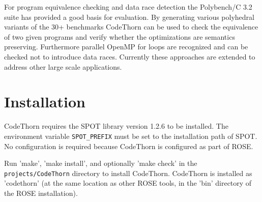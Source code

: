 \documentclass[natbib]{article}
\begin{document}
For program equivalence checking and data race detection the
Polybench/C 3.2 suite has provided a good basis for evaluation. By
generating various polyhedral variants of the 30+ benchmarks CodeThorn
can be used to check the equivalence of two given programs and verify
whether the optimizations are semantics preserving. Furthermore
parallel OpenMP for loops are recognized and can be checked not to
introduce data races. Currently these approaches are extended to
address other large scale applications.

\section{Installation}

CodeThorn requires the SPOT library version 1.2.6 to be installed. The
environment variable \verb+SPOT_PREFIX+ must be set to the
installation path of SPOT. No configuration is required because
CodeThorn is configured as part of ROSE.

Run 'make', 'make install', and optionally 'make check' in the
\verb+projects/CodeThorn+ directory to install CodeThorn. CodeThorn is
installed as 'codethorn' (at the same location as other ROSE tools, in
the 'bin' directory of the ROSE installation).
\end{document}
